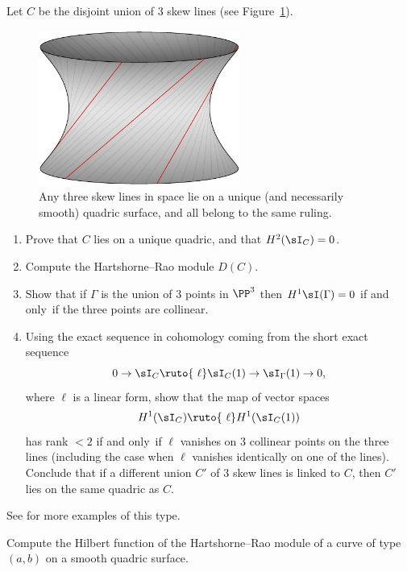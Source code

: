 \begin{exercise}
Let $C$ be the disjoint union of 3 
skew lines
%
(see Figure~\ref{Fig15.2}).

\begin{figure}[b]
\includegraphics[height=2in]{main/Fig15-2-SinglyRuledHyperboloid-good}
\caption{Any three skew lines in space lie on a unique 
(and necessarily 
smooth) quadric surface, and all belong to the same 
ruling.
%
}
\label{Fig15.2}
\end{figure}

\begin{enumerate}
\item Prove that $C$ lies on a unique quadric, and that $H^2(\sI_C) = 0$.
%
\item Compute the 
Hartshorne--Rao module
 $D(C)$.
%
\item Show that if $\Gamma$ is the union of 3 points in $\PP^3$ then
$H^1\sI(\Gamma) = 0$ if and only~if the three points are collinear.
\item Using the exact sequence in cohomology coming from the short
exact sequence
$$
0\to \sI_C \ruto {\ \ell} \sI_C(1) \to \sI_\Gamma(1) \to 0 ,
$$
where $\ell$ is a linear form, show that the map of vector spaces
$$
H^1(\sI_C) \ruto {\ \ell} H^1(\sI_C(1))
$$
has rank $<2$ if and only~if $\ell$ vanishes on 3 collinear points on the
three lines (including the case when $\ell$ vanishes identically on one
of the lines).
Conclude that if a different union $C'$ of 3 skew lines is linked to $C$,
then $C'$ lies on the same quadric as $C$.
\end{enumerate}
See \cite{Migliore} for more examples of this type.
\end{exercise}

\begin{exercise}
Compute the 
Hilbert function
%
of the 
Hartshorne--Rao module
%
 of a curve
of type $(a,b)$ on a smooth quadric surface.
\end{exercise}

